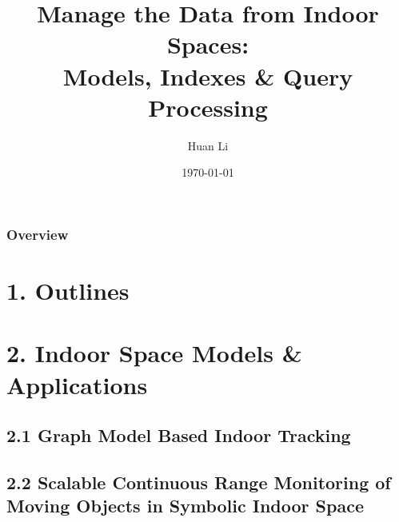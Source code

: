 \documentclass{beamer}
\title[Manage the Data from Indoor Spaces]{Manage the Data from Indoor Spaces: \\Models, Indexes \& Query Processing} %
\author{Huan Li} %
\institute[Zhejiang University] %
{
Database Laboratory, Zhejiang University \\ %
\medskip
\textit{lihuancs@zju.edu.cn} %
}
\date{\today} %
\begin{document}
\begin{frame}
\titlepage %
\end{frame}

\begin{frame}
\frametitle{Overview} %
\setcounter{tocdepth}{1}
\tableofcontents %
\end{frame}

\AtBeginSection[]
{
    \begin{frame}[shrink]
        \tableofcontents[sectionstyle=show/shaded,subsectionstyle=show/shaded/hide]
    \end{frame}
}


\section{1. Outlines}

% 
% 

\section{2. Indoor Space Models \& Applications}

\subsection{2.1 Graph Model Based Indoor Tracking}

% 
% 

\subsection{2.2 Scalable Continuous Range Monitoring of Moving Objects in Symbolic Indoor Space}
\end{document}
